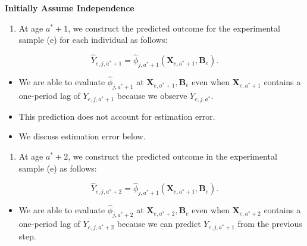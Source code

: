 \documentclass[static]{JJH-Beamer}
\begin{document}
\begin{frame}

\begin{center}
\textbf{Initially Assume Independence}
\end{center}

\begin{enumerate}[2.]
\item At age $a^*+1$, we construct the predicted outcome for the experimental sample (e) for each individual as follows:
\end{enumerate}

\begin{equation}
\hat{Y}_{e,j,a^*+1} = \hat{\phi}_{j,a^*+1} \left( \bm{X}_{e,a^*+1}, \bm{B}_e \right).
\end{equation}

\begin{itemize}
\item We are able to evaluate $\hat{\phi}_{j,a^*+1}$ at $ \bm{X}_{e,a^*+1}, \bm{B}_e $ even when $\bm{X}_{e,a^*+1}$ contains a one-period lag of $Y_{e,j,a^*+1}$ because we observe $Y_{e,j,a^*}$.
\item This prediction does not account for estimation error.
\item We discuss estimation error below.
\end{itemize}

\end{frame}

\begin{frame}

\begin{enumerate}[3.]
\item At age $a^*+2$, we construct the predicted outcome in the experimental sample (e) as follows:
\end{enumerate}

\begin{equation}
\hat{Y}_{e,j,a^*+2} = \hat{\phi}_{j,a^*+1} \left( \bm{X}_{e,a^*+1}, \bm{B}_e \right).
\end{equation}

\begin{itemize}
\item We are able to evaluate $\hat{\phi}_{j,a^*+2}$ at $ \bm{X}_{e,a^*+2}, \bm{B}_e $ even when $\bm{X}_{e,a^*+2}$ contains a one-period lag of $Y_{e,j,a^*+2}$ because we can predict $Y_{e,j,a^*+1}$ from the previous step.
\end{itemize}

\end{frame}
\end{document}
